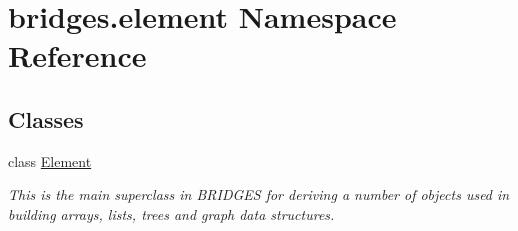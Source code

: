 \hypertarget{namespacebridges_1_1element}{}\section{bridges.\+element Namespace Reference}
\label{namespacebridges_1_1element}
\subsection*{Classes}
\begin{DoxyCompactItemize}
\item 
class \mbox{\hyperlink{classbridges_1_1element_1_1_element}{Element}}
\begin{DoxyCompactList}\small\item\em This is the main superclass in B\+R\+I\+D\+G\+ES for deriving a number of objects used in building arrays, lists, trees and graph data structures. \end{DoxyCompactList}\end{DoxyCompactItemize}
